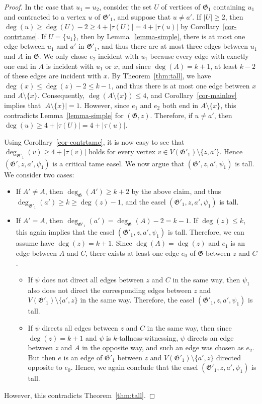 \documentclass{article}
\newcommand\g{\mathfrak{G}}
\begin{document}
\begin{proof}
In the case that $u_1=u_2$, consider the set $U$ of vertices of $\g_1$ containing $u_1$ and contracted to a vertex $u$ of $\g'_1$,
and suppose that $u\neq a'$.  If $|U|\ge 2$, then $\deg(u)\ge \deg(U)-2\ge 4+|\tau(U)|=4+|\tau(u)|$ by Corollary~\ref{cor-contrtame}.
If $U=\{u_1\}$, then by Lemma~\ref{lemma-simple}, there is at most one edge between $u_1$ and $a'$ in $\g'_1$, and thus
there are at most three edges between $u_1$ and $A$ in $\g$.  We only chose $e_2$ incident with $u_1$ because every edge with exactly one end in $A$
is incident with $u_1$ or $x$, and since $\deg(A)=k+1$, at least $k-2$ of these edges are incident with $x$.  By Theorem~\ref{thm:tall},
we have $\deg(x)\le \deg(z)-2\le k-1$, and thus there is at most one edge between $x$ and $A\setminus\{x\}$.  Consequently,
$\deg(A\setminus \{x\})\le 4$, and Corollary~\ref{cor-mainlov} implies that $|A\setminus\{x\}|=1$.  However, since $e_1$ and $e_2$
both end in $A\setminus \{x\}$, this contradicts Lemma~\ref{lemma-simple} for $(\g,z)$.
Therefore, if $u\neq a'$, then $\deg(u)\ge 4+|\tau(U)|=4+|\tau(u)|$.

Using Corollary~\ref{cor-contrtame}, it is now easy to see that $\deg_{\g'_1}(v)\ge 4+|\tau(v)|$ holds for every vertex $v\in V(\g'_1)\setminus\{z,a'\}$. Hence $(\g',z,a',\psi_{1})$ is a critical tame easel. We now argue that $(\g',z,a',\psi_{1})$ is tall. 
We consider two cases:
\begin{itemize}
\item If $A'\neq A$, then $\deg_{\g}(A')\ge k+2$ by the above claim, and thus $\deg_{\g'_1}(a') \ge k\ge \deg(z)-1$, and the easel $(\g'_1,z,a',\psi_1)$ is tall.
\item If $A' = A$, then $\deg_{\g'_{1}}(a') = \deg_{\g}(A) -2 = k-1$. 
If $\deg(z) \leq k$, this again implies that the easel $(\g'_{1},z,a',\psi_{1})$ is tall.
Therefore, we can assume have $\deg(z)=k+1$.
Since $\deg(A) = \deg(z)$ and $e_{1}$
is an edge between $A$ and $C$, there exists at least one edge $e_{0}$ of $\g$
between $z$ and $C$.
\begin{itemize}
\item If $\psi$ does not direct all edges between $z$ and $C$ in
the same way, then $\psi_{1}$ also does not direct the corresponding edges
between $z$ and $V(\g'_{1}) \setminus \{a',z\}$ in the same way. 
Therefore, the easel $(\g'_1,z,a',\psi_1)$ is tall.

\item If $\psi$ directs all edges between $z$ and $C$ in the same way, then since
$\deg(z)=k+1$ and $\psi$ is $k$-tallness-witnessing, $\psi$ directs an edge
between $z$ and $A$ in the opposite way, and such an edge was chosen as $e_2$.
But then $e$ is an edge of $\g'_1$ between $z$ and $V(\g'_1)\setminus\{a',z\}$
directed opposite to $e_0$.
Hence, we again conclude that the easel $(\g'_1,z,a',\psi_1)$ is tall.
\end{itemize}
\end{itemize}
However, this contradicts Theorem~\ref{thm:tall}.
\end{proof}
\end{document}
